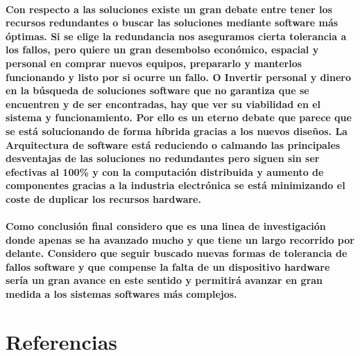 \documentclass{./llncs2e/llncs}
\begin{document}
\paragraph{
Con respecto a las soluciones existe un gran debate entre tener los recursos redundantes o buscar las soluciones mediante software m\'{a}s \'{o}ptimas. Si se elige la redundancia nos aseguramos cierta tolerancia a los fallos, pero quiere un gran desembolso econ\'{o}mico, espacial y personal en comprar nuevos equipos, prepararlo y manterlos funcionando y listo por si ocurre un fallo. O Invertir personal y dinero en la b\'{u}squeda de soluciones software que no garantiza que se encuentren y de ser encontradas, hay que ver su viabilidad en el sistema y funcionamiento. Por ello es un eterno debate que parece que se est\'{a} solucionando de forma h\'{i}brida gracias a los nuevos diseños. La Arquitectura de software est\'{a} reduciendo o calmando las principales desventajas de las soluciones no redundantes pero siguen sin ser efectivas al 100\% y con la computaci\'{o}n distribuida y aumento de componentes gracias a la industria electr\'{o}nica se est\'{a} minimizando el coste de duplicar los recursos hardware. 
}

\paragraph{
Como conclusi\'{o}n final considero que es una linea de investigaci\'{o}n donde apenas se ha avanzado mucho y que tiene un largo recorrido por delante. Considero que seguir buscado nuevas formas de tolerancia de fallos software y que compense la falta de un dispositivo hardware  ser\'{i}a un gran avance en este sentido y permitir\'{a} avanzar en gran medida a los sistemas softwares m\'{a}s complejos.
}

\section{Referencias}


\end{document}
